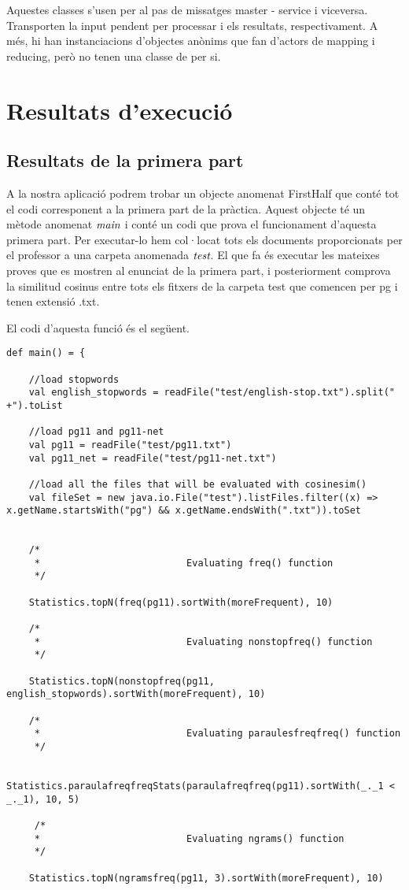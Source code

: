 \documentclass{report}
\begin{document}
Aquestes classes s'usen per al pas de missatges master - service i viceversa. Transporten la input pendent per processar i els resultats, respectivament. A més, hi han instanciacions d'objectes anònims que fan d'actors de mapping i reducing, però no tenen una classe de per si.

\chapter{Resultats d'execució}

\section{Resultats de la primera part}

A la nostra aplicació podrem trobar un objecte anomenat FirstHalf que conté tot el codi corresponent a la primera part de la pràctica. Aquest objecte té un mètode anomenat $\emph{main}$ i conté un codi que prova el funcionament d'aquesta primera part. Per executar-lo hem col·locat tots els documents proporcionats per el professor a una carpeta anomenada $\emph{test}$. El que fa és executar les mateixes proves que es mostren al enunciat de la primera part, i posteriorment comprova la similitud cosinus entre tots els fitxers de la carpeta test que comencen per pg i tenen extensió .txt.

\newpage

El codi d'aquesta funció és el següent.

\begin{lstlisting}[style=scalaHighlight]
def main() = {

    //load stopwords
    val english_stopwords = readFile("test/english-stop.txt").split(" +").toList

    //load pg11 and pg11-net
    val pg11 = readFile("test/pg11.txt")
    val pg11_net = readFile("test/pg11-net.txt")

    //load all the files that will be evaluated with cosinesim()
    val fileSet = new java.io.File("test").listFiles.filter((x) => x.getName.startsWith("pg") && x.getName.endsWith(".txt")).toSet


    /*
     * 							Evaluating freq() function
     */

    Statistics.topN(freq(pg11).sortWith(moreFrequent), 10)

    /*
     * 							Evaluating nonstopfreq() function
     */

    Statistics.topN(nonstopfreq(pg11, english_stopwords).sortWith(moreFrequent), 10)

    /*
     * 							Evaluating paraulesfreqfreq() function
     */

    Statistics.paraulafreqfreqStats(paraulafreqfreq(pg11).sortWith(_._1 < _._1), 10, 5)

     /*
     * 							Evaluating ngrams() function
     */

    Statistics.topN(ngramsfreq(pg11, 3).sortWith(moreFrequent), 10)
\end{lstlisting}
\end{document}
